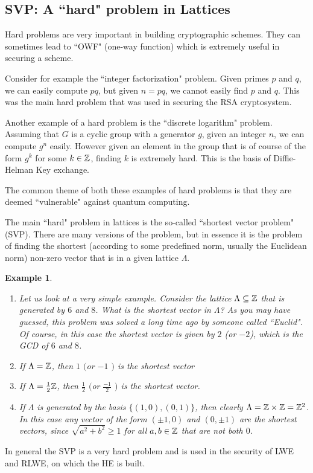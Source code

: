 \documentclass[12pt]{article}
\theoremstyle{plain}
\newtheorem{example}{Example}
\theoremstyle{definition}
\theoremstyle{remark}
\begin{document}
\subsection{SVP: A ``hard" problem in Lattices}
Hard problems are very important in building cryptographic schemes. They can sometimes lead to ``OWF" (one-way function) which is extremely useful in securing a scheme.

Consider for example the ``integer factorization" problem. Given primes $p$ and $q$, we can easily compute $pq$, but given $n=pq$, we cannot easily find $p$ and $q$. This was the main hard problem that was used in securing the RSA cryptosystem.

Another example of a hard problem is the ``discrete logarithm" problem. Assuming that $G$ is a cyclic group with a generator $g$, given an integer $n$, we can compute $g^n$ easily. However given an element in the group that is of course of the form $g^k$ for some $k\in \mathbb{Z}$, finding $k$ is extremely hard. This is the basis of Diffie-Helman Key exchange.

The common theme of both these examples of hard problems is that they are deemed ``vulnerable" against quantum computing.

The main ``hard" problem in lattices is the so-called ``shortest vector problem" (SVP). There are many versions of the problem, but in essence it is the problem of finding the shortest (according to some predefined norm, usually the Euclidean norm) non-zero vector that is in a given lattice $\Lambda$.
\begin{example}
\begin{enumerate}
    \item Let us look at a very simple example. Consider the lattice $\Lambda \subseteq \mathbb{Z}$ that is generated by $6$ and $8$. What is the shortest vector in $\Lambda$? As you may have guessed, this problem was solved a long time ago by someone called ``Euclid". Of course, in this case the shortest vector is given by $2$ (or $-2$), which is the GCD of $6$ and $8$.
  \item If $\Lambda=\mathbb{Z}$, then $1$ $($or $-1$ $)$ is the shortest vector
  \item If $\Lambda = \frac{1}{2}\mathbb{Z}$, then $\frac{1}{2}$ $($or $\frac{-1}{2}$ $)$ is the shortest vector.
\item If $\Lambda$ is generated by the basis $\{(1,0), (0,1)\}$, then clearly $\Lambda = \mathbb{Z}\times \mathbb{Z}=\mathbb{Z}^2$. In this case any vector of the form
$(\pm 1,0)$ and $(0,\pm 1)$ are the shortest vectors, since $\sqrt{a^2+b^2}\geq 1$ for all $a, b\in \mathbb{Z}$ that are not both $0$.
\end{enumerate}
\end{example}
In general the SVP is a very hard problem and is used in the security of LWE and RLWE, on which the HE is built.
\end{document}
